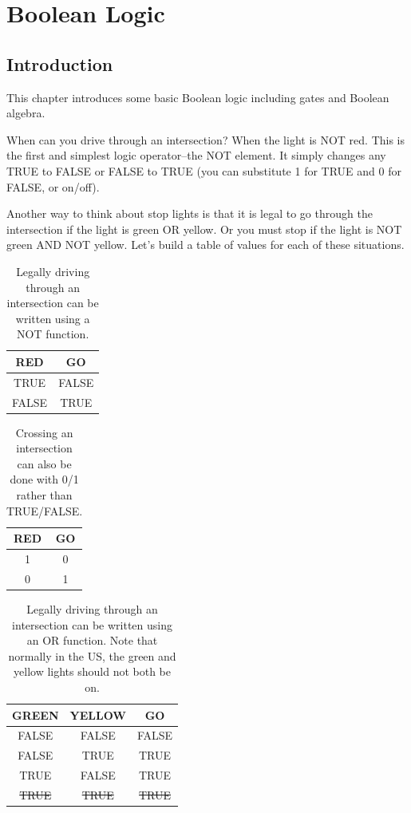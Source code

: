 \chapter{Boolean Logic}

\section{Introduction}
This chapter introduces some basic Boolean logic including gates and Boolean algebra.

When can you drive through an intersection? When the light is NOT red. This is the first and simplest
logic operator--the NOT element. It simply changes any TRUE to FALSE or FALSE to TRUE (you can substitute
1 for TRUE and 0 for FALSE, or on/off).

Another way to think about stop lights is that it is legal to go through the intersection 
if the light is green OR yellow. Or you must stop if the light is NOT green AND NOT yellow. 
Let's build a table of values for each of these situations. 

\begin{table}[!ht]
	\centering
	\begin{tabular}{| c | c |}
		\hline
		\textbf{RED} & \textbf{GO} \\ 
		\hline
		TRUE & FALSE  \\ \hline
		FALSE & TRUE  \\ \hline
	\end{tabular}
	\caption{Legally driving through an intersection can be written using a NOT function.}
	\label{table:stoptf}
\end{table}

\begin{table}[!ht]
	\centering
	\begin{tabular}{| c | c |}
		\hline
		\textbf{RED} & \textbf{GO} \\ 
		\hline
		1 & 0  \\ \hline
		0 & 1  \\ \hline
	\end{tabular}
	\caption{Crossing an intersection can also be done with 0/1 rather than TRUE/FALSE.}
	\label{table:stop01}
\end{table}

\begin{table}[!ht]
	\centering
	\begin{tabular}{| c | c | c |}
		\hline
		\textbf{GREEN} & \textbf{YELLOW} & \textbf{GO} \\ 
		\hline
		FALSE & FALSE & FALSE \\ \hline
		FALSE & TRUE  & TRUE  \\ \hline
		TRUE  & FALSE & TRUE  \\ \hline
		\sout{TRUE}  & \sout{TRUE}  & \sout{TRUE}  \\ \hline
	\end{tabular}
	\caption{Legally driving through an intersection can be written using an OR function.
                Note that normally in the US, the green and yellow lights should not both be on.}
	\label{table:stopor}
\end{table}

